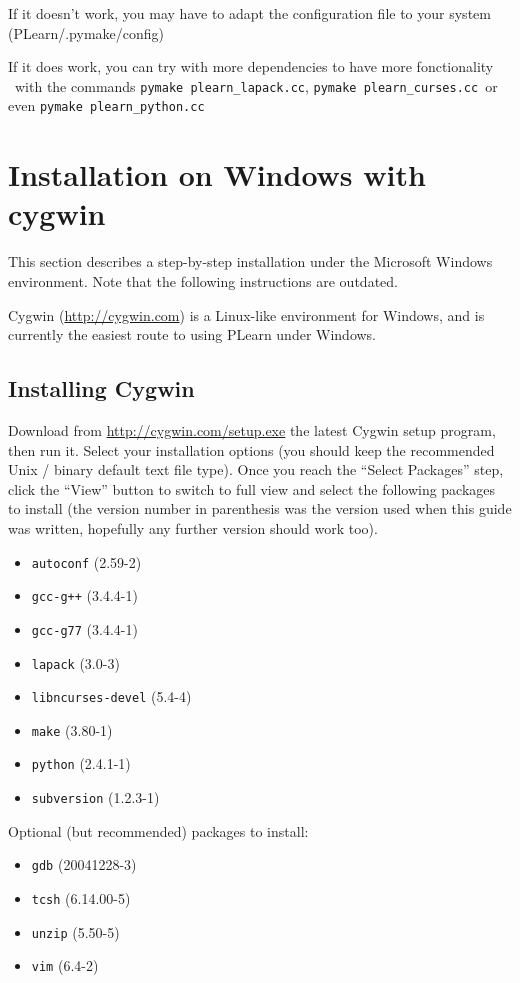 \documentclass[11pt]{book}
\begin{document}
If it doesn't work, you may have to adapt the configuration file to your system
(PLearn/.pymake/config)

If it does work, you can try with more dependencies to have more fonctionality \
with the commands \verb!pymake plearn_lapack.cc!, \verb!pymake plearn_curses.cc!\
 or even \verb!pymake plearn_python.cc!


\section{Installation on Windows with cygwin}
\label{sec:windows}

This section describes a step-by-step installation under the Microsoft Windows environment.
Note that the following instructions are outdated.

Cygwin (\url{http://cygwin.com}) is a Linux-like environment for Windows, and is
currently the easiest route to using PLearn under Windows.

\subsection{Installing Cygwin}
Download from \url{http://cygwin.com/setup.exe} the latest Cygwin setup program,
then run it.
Select your installation options (you should keep the recommended Unix / binary default
text file type).
Once you reach the ``Select Packages'' step, click the ``View'' button to switch
to full view and select the following packages to install (the version number in
parenthesis was the version used when this guide was written, hopefully any further
version should work too).

\begin{itemize}
\item \verb!autoconf! (2.59-2)
\item \verb!gcc-g++! (3.4.4-1)
\item \verb!gcc-g77! (3.4.4-1)
\item \verb!lapack! (3.0-3)
\item \verb!libncurses-devel! (5.4-4)
\item \verb!make! (3.80-1)
\item \verb!python! (2.4.1-1)
\item \verb!subversion! (1.2.3-1)
\end{itemize}

Optional (but recommended) packages to install:
\begin{itemize}
\item \verb!gdb! (20041228-3)
\item \verb!tcsh! (6.14.00-5)
\item \verb!unzip! (5.50-5)
\item \verb!vim! (6.4-2)
\end{itemize}
\end{document}
